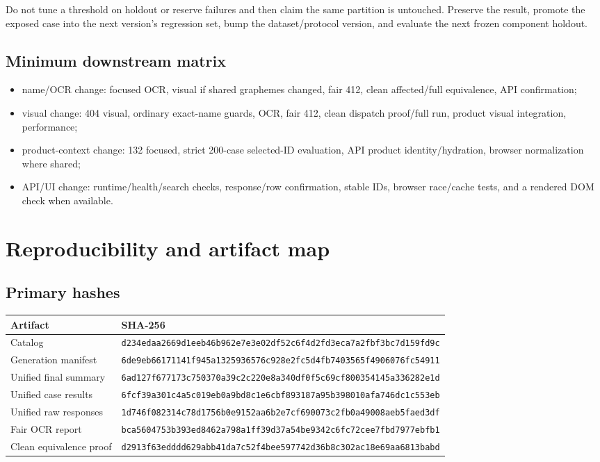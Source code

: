 \documentclass[10pt,oneside]{book}
\begin{document}
\begin{warningbox}[title=Holdout discipline]
Do not tune a threshold on holdout or reserve failures and then claim the same
partition is untouched. Preserve the result, promote the exposed case into the
next version's regression set, bump the dataset/protocol version, and evaluate
the next frozen component holdout.
\end{warningbox}

\section{Minimum downstream matrix}

\begin{itemize}
\item name/OCR change: focused OCR, visual if shared graphemes changed, fair 412,
clean affected/full equivalence, API confirmation;
\item visual change: 404 visual, ordinary exact-name guards, OCR, fair 412,
clean dispatch proof/full run, product visual integration, performance;
\item product-context change: 132 focused, strict 200-case selected-ID
evaluation, API product identity/hydration, browser normalization where shared;
\item API/UI change: runtime/health/search checks, response/row confirmation,
stable IDs, browser race/cache tests, and a rendered DOM check when available.
\end{itemize}

\chapter{Reproducibility and artifact map}

\section{Primary hashes}

\begin{longtable}{@{}p{2.2in}p{4.6in}@{}}
\toprule
Artifact & SHA-256 \\
\midrule
Catalog & \texttt{d234edaa2669d1eeb46b962e7e3e02df52c6f4d2fd3eca7a2fbf3bc7d159fd9c} \\
Generation manifest & \texttt{6de9eb66171141f945a1325936576c928e2fc5d4fb7403565f4906076fc54911} \\
Unified final summary & \texttt{6ad127f677173c750370a39c2c220e8a340df0f5c69cf800354145a336282e1d} \\
Unified case results & \texttt{6fcf39a301c4a5c019eb0a9bd8c1e6cbf893187a95b398010afa746dc1c553eb} \\
Unified raw responses & \texttt{1d746f082314c78d1756b0e9152aa6b2e7cf690073c2fb0a49008aeb5faed3df} \\
Fair OCR report & \texttt{bca5604753b393ed8462a798a1ff39d37a54be9342c6fc72cee7fbd7977ebfb1} \\
Clean equivalence proof & \texttt{d2913f63edddd629abb41da7c52f4bee597742d36b8c302ac18e69aa6813babd} \\
\bottomrule
\end{longtable}
\end{document}
